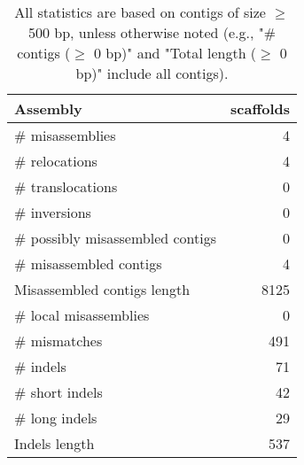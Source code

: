 \documentclass[12pt,a4paper]{article}
\begin{document}
\begin{table}[ht]
\begin{center}
\caption{All statistics are based on contigs of size $\geq$ 500 bp, unless otherwise noted (e.g., "\# contigs ($\geq$ 0 bp)" and "Total length ($\geq$ 0 bp)" include all contigs).}
\begin{tabular}{|l*{1}{|r}|}
\hline
Assembly & scaffolds \\ \hline
\# misassemblies & 4 \\ \hline
\hspace{5mm}\# relocations & 4 \\ \hline
\hspace{5mm}\# translocations & 0 \\ \hline
\hspace{5mm}\# inversions & 0 \\ \hline
\# possibly misassembled contigs & 0 \\ \hline
\# misassembled contigs & 4 \\ \hline
Misassembled contigs length & 8125 \\ \hline
\# local misassemblies & 0 \\ \hline
\# mismatches & 491 \\ \hline
\# indels & 71 \\ \hline
\hspace{5mm}\# short indels & 42 \\ \hline
\hspace{5mm}\# long indels & 29 \\ \hline
Indels length & 537 \\ \hline
\end{tabular}
\end{center}
\end{table}
\end{document}
